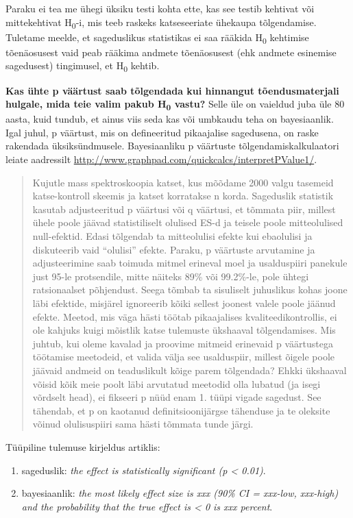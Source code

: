 \documentclass[]{book}
\begin{document}
Paraku ei tea me ühegi üksiku testi kohta ette, kas see testib kehtivat
või mittekehtivat H\textsubscript{0}-i, mis teeb raskeks katseseeriate
ühekaupa tõlgendamise. Tuletame meelde, et sageduslikus statistikas ei
saa rääkida H\textsubscript{0} kehtimise tõenäosusest vaid peab rääkima
andmete tõenäosusest (ehk andmete esinemise sagedusest) tingimusel, et
H\textsubscript{0} kehtib.

\textbf{Kas ühte p väärtust saab tõlgendada kui hinnangut
tõendusmaterjali hulgale, mida teie valim pakub H\textsubscript{0}
vastu?} Selle üle on vaieldud juba üle 80 aasta, kuid tundub, et ainus
viis seda kas või umbkaudu teha on bayesiaanlik. Igal juhul, p väärtust,
mis on defineeritud pikaajalise sagedusena, on raske rakendada
üksiksündmusele. Bayesiaanliku p väärtuste tõlgendamiskalkulaatori
leiate aadressilt
\url{http://www.graphpad.com/quickcalcs/interpretPValue1/}.

\begin{quote}
Kujutle mass spektroskoopia katset, kus mõõdame 2000 valgu tasemeid
katse-kontroll skeemis ja katset korratakse n korda. Sageduslik
statistik kasutab adjusteeritud p väärtusi või q väärtusi, et tõmmata
piir, millest ühele poole jäävad statistiliselt olulised ES-d ja teisele
poole mitteolulised null-efektid. Edasi tõlgendab ta mitteolulisi efekte
kui ebaolulisi ja diskuteerib vaid ``olulisi'' efekte. Paraku, p
väärtuste arvutamine ja adjusteerimine saab toimuda mitmel erineval moel
ja usalduspiiri panekule just 95-le protsendile, mitte näiteks 89\% või
99.2\%-le, pole ühtegi ratsionaalset põhjendust. Seega tõmbab ta
sisuliselt juhuslikus kohas joone läbi efektide, misjärel ignoreerib
kõiki sellest joonest valele poole jäänud efekte. Meetod, mis väga hästi
töötab pikaajalises kvaliteedikontrollis, ei ole kahjuks kuigi mõistlik
katse tulemuste ükshaaval tõlgendamises. Mis juhtub, kui oleme kavalad
ja proovime mitmeid erinevaid p väärtustega töötamise meetodeid, et
valida välja see usalduspiir, millest õigele poole jäävaid andmeid on
teaduslikult kõige parem tõlgendada? Ehkki ükshaaval võisid kõik meie
poolt läbi arvutatud meetodid olla lubatud (ja isegi võrdselt head), ei
fikseeri p nüüd enam 1. tüüpi vigade sagedust. See tähendab, et p on
kaotanud definitsioonijärgse tähenduse ja te oleksite võinud
olulisuspiiri sama hästi tõmmata tunde järgi.
\end{quote}

Tüüpiline tulemuse kirjeldus artiklis:

\begin{enumerate}
\def\labelenumi{\arabic{enumi}.}
\item
  sageduslik: \emph{the effect is statistically significant (p
  \textless{} 0.01)}.
\item
  bayesiaanlik: \emph{the most likely effect size is xxx (90\% CI =
  xxx-low, xxx-high) and the probability that the true effect is
  \textless{} 0 is xxx percent}.
\end{enumerate}
\end{document}
